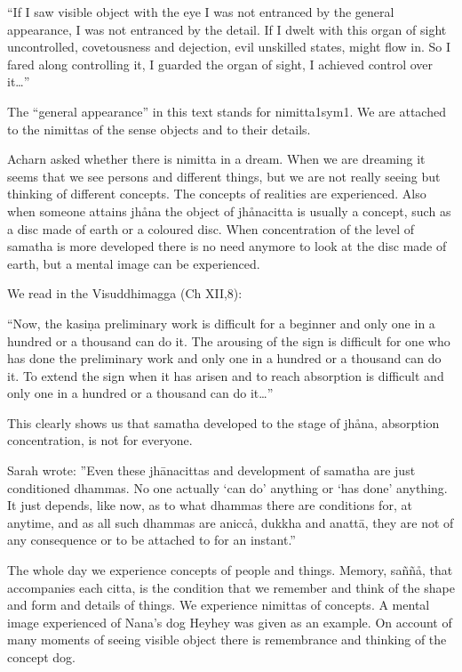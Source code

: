 \documentclass[10pt,a4paper,final]{article}
\begin{document}
``If I saw visible
object with the eye I was not entranced by the general appearance, I was
not entranced by the detail. If I dwelt with this organ of sight
uncontrolled, covetousness and dejection, evil unskilled states, might
flow in. So I fared along controlling it, I guarded the organ of sight,
I achieved control over it\ldots''

The ``general appearance'' in this text
stands for
nimitta\protect\hyperlinksdfootnote1sym1. We are
attached to the nimittas of the sense objects and to their details. 

Acharn asked whether there is nimitta in a
dream. When we are dreaming it seems that we see persons and different
things, but we are not really seeing but thinking of different concepts.
The concepts of realities are experienced. Also when someone attains
jhåna the object of jhånacitta is usually a concept, such as a disc made
of earth or a coloured disc. When concentration of the level of samatha
is more developed there is no need anymore to look at the disc made of
earth, but a mental image can be experienced. 

We read in the Visuddhimagga (Ch XII,8):

``Now, the
kasiṇa preliminary work is difficult
for a beginner and only one in a hundred or a thousand can do it. The
arousing of the sign is difficult for one who has done the preliminary
work and only one in a hundred or a thousand can do it. To extend the
sign when it has arisen and to reach absorption is difficult and only
one in a hundred or a thousand can do it\ldots''

This clearly shows us that samatha developed
to the stage of jhåna, absorption concentration, is not for everyone. 

Sarah wrote:
''Even these
jhānacittas and development of
samatha are just conditioned dhammas. No one actually
`can
do' anything or
`has
done' anything. It just
depends, like now, as to what dhammas there are conditions
for, at
anytime, and as all such
dhammas are aniccå, dukkha and
anattā, they are not of any
consequence or to be attached to for an instant.''

The whole day we experience concepts of people and things.
Memory, saññå, that accompanies each citta, is the condition that we
remember and think of the shape and form and details of things. We
experience nimittas of concepts. A mental image experienced of Nana's
dog Heyhey was given as an example. On account of many moments of seeing
visible object there is remembrance and thinking of the concept dog. 
\end{document}
